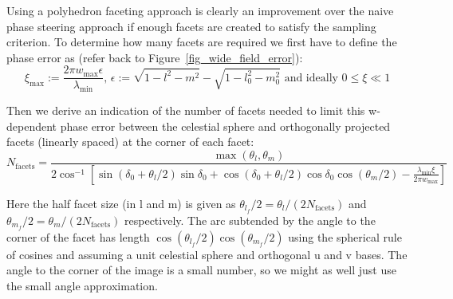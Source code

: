 Using a polyhedron faceting approach is clearly an improvement over the naive phase steering approach if enough facets are created to satisfy the sampling 
criterion. To determine how many facets are required we first have to define the phase error as (refer back to Figure~\ref{fig_wide_field_error}):
\begin{equation}
\label{eqn_phase_error}
\xi_{\text{max}}:=\frac{2{\pi}w_{\text{max}}\epsilon}{{\lambda_{\text{min}}}} \text{, }\epsilon:=\sqrt{1-l^2-m^2} - \sqrt{1-l_0^2-m_0^2} \text{ and ideally } 0{\leq\xi\ll}1
\end{equation}

Then we derive an indication of the number of facets needed to limit this w-dependent phase error between the celestial sphere and orthogonally projected 
facets (linearly spaced) at the corner of each facet:
\begin{equation}
N_{\text{facets}} = \frac{\max{(\theta_l,\theta_m)}}{2\cos^{-1}{\left[\sin{(\delta_0 + \theta_l/2)}\sin{\delta_0} + \cos{(\delta_0 + \theta_l/2)}\cos{\delta_0}\cos{(\theta_m/2)}-\frac{\lambda_{\text{min}}\xi}{2{\pi}w_{\text{max}}}\right]}}
\end{equation}

Here the half facet size (in l and m) is given as $\theta_{l_f}/2 = \theta_l/(2N_{\text{facets}})$ and $\theta_{m_f}/2 = \theta_m/(2N_{\text{facets}})$ respectively. The arc subtended by the angle to the corner of the facet has 
length $\cos{(\theta_{l_f}/2)}\cos{(\theta_{m_f}/2)}$ using the spherical rule of cosines and assuming a unit celestial sphere and orthogonal u and v bases. The angle to the corner of the image is a small number, so 
we might as well just use the small angle approximation.

